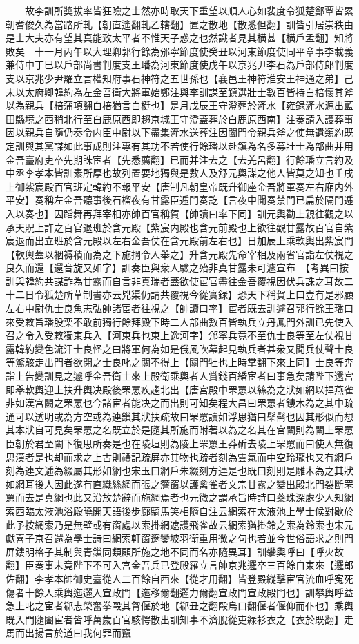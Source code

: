 　　故李訓所奬拔率皆狂險之士然亦時取天下重望以順人心如裴度令狐楚鄭覃皆累朝耆俊久為當路所軋【朝直遙翻軋乙轄翻】置之散地【散悉但翻】訓皆引居崇秩由是士大夫亦有望其真能致太平者不惟天子惑之也然識者見其横甚【横戶孟翻】知將敗矣　十一月丙午以大理卿郭行餘為邠寜節度使癸丑以河東節度使同平章事李載義兼侍中丁巳以戶部尚書判度支王璠為河東節度使戊午以京兆尹李石為戶部侍郎判度支以京兆少尹羅立言權知府事石神符之五世孫也【襄邑王神符淮安王神通之弟】己未以太府卿韓約為左金吾衛大將軍始鄭注與李訓謀至鎮選壯士數百皆持白棓懷其斧以為親兵【棓蒲項翻白棓猶言白梃也】是月戊辰王守澄葬於滻水【雍録滻水源出藍田縣境之西稍北行至白鹿原西即趨京城王守澄蓋葬於白鹿原西南】注奏請入護葬事因以親兵自隨仍奏令内臣中尉以下盡集滻水送葬注因闔門令親兵斧之使無遺類約既定訓與其黨謀如此事成則注專有其功不若使行餘璠以赴鎮為名多募壯士為部曲并用金吾臺府吏卒先期誅宦者【先悉薦翻】已而并注去之【去羌呂翻】行餘璠立言約及中丞李孝本皆訓素所厚也故列置要地獨與是數人及舒元輿謀之他人皆莫之知也壬戌上御紫宸殿百官班定韓約不報平安【唐制凡朝皇帝既升御座金吾將軍奏左右廂内外平安】奏稱左金吾聽事後石榴夜有甘露臣逓門奏訖【言夜中聞奏禁門已扁於隔門逓入以奏也】因蹈舞再拜宰相亦帥百官稱賀【帥讀曰率下同】訓元輿勸上親往觀之以承天貺上許之百官退班於含元殿【紫宸内殿也含元前殿也上欲往觀甘露故百官自紫宸退而出立班於含元殿以左右金吾仗在含元殿前左右也】日加辰上乘軟輿出紫宸門【軟輿蓋以裀褥積而為之下施掆令人舉之】升含元殿先命宰相及兩省官詣左仗視之良久而還【還音旋又如字】訓奏臣與衆人驗之殆非真甘露未可遽宣布　【考異曰按訓與韓約共謀詐為甘露而自言非真瑞者蓋欲使宦官盡往金吾覆視因伏兵誅之耳故二十二日令狐楚所草制書亦云兇渠仍請共覆視今從實録】恐天下稱賀上曰豈有是邪顧左右中尉仇士良魚志弘帥諸宦者往視之【帥讀曰率】宦者既去訓遽召郭行餘王璠曰來受敕旨璠股栗不敢前獨行餘拜殿下時二人部曲數百皆執兵立丹鳳門外訓已先使入召之令入受敕獨東兵入【河東兵也東上逸河字】邠寜兵竟不至仇士良等至左仗視甘露韓約變色流汗士良怪之曰將軍何為如是俄風吹幕起見執兵者甚衆又聞兵仗聲士良等驚駭走出門者欲閉之士良叱之關不得上【關門牡也上時掌翻下來上同】士良等奔詣上告變訓見之遽呼金吾衛士來上殿衛乘輿者人賞錢百緍宦者曰事急矣請陛下還宫即舉軟輿迎上扶升輿决殿後罘罳疾趨北出【唐宫殿中罘罳以絲為之狀如網以捍燕雀非如漢宫闕之罘罳也今諸宦者能决之而出則可知矣程大昌曰罘罳者鏤木為之其中疏通可以透明或為方空或為連鎻其狀扶疏故曰罘罳讀如浮思猶曰䯱髵也因其形似而想其本狀自可見矣罘罳之名既立於是隨其所施而附著以為之名其在宮闕則為闕上罘罳臣朝於君至闕下復思所奏是也在陵垣則為陵上罘罳王莽斫去陵上罘罳而曰使人無復思漢者是也却而求之上古則禮記疏屏亦其物也疏者刻為雲氣而中空玲瓏也又有網戶刻為連文逓為綴屬其形如網也宋玉曰網戶朱綴刻方連是也既曰刻則是雕木為之其狀如網耳後人因此遂有直織絲網而張之簷窗以護禽雀者文宗甘露之變出殿北門裂斷罘罳而去是真網也此又沿放楚辭而施網焉者也元微之謂承旨時詩曰蘂珠深處少人知網索西臨太液池浴殿曉開天語後步廊騎馬笑相隨自注云網索在太液池上學士候對歇於此予按網索乃是無壁或有窗處以索掛網遮護飛雀故云網索猶掛鈴之索為鈴索也宋元獻喜子京召還為學士詩曰網索軒窗邃鑾坡羽衛重用微之句也若並今世俗語求之則門屏鏤明格子其制與青鎻同類顧所施之地不同而名亦隨異耳】訓攀輿呼曰【呼火故翻】臣奏事未竟陛下不可入宫金吾兵已登殿羅立言帥京兆邏卒三百餘自東來【邏郎佐翻】李孝本帥御史臺從人二百餘自西來【從才用翻】皆登殿縱擊宦官流血呼寃死傷者十餘人乘輿迤邐入宣政門【迤移爾翻邐力爾翻宣政門宣政殿門也】訓攀輿呼益急上叱之宦者郗志榮奮拳毆其胷偃於地【郗丑之翻毆烏口翻偃者偃仰而仆也】乘輿既入門隨闔宦者皆呼萬歲百官駭愕散出訓知事不濟脫從吏緑衫衣之【衣於既翻】走馬而出揚言於道曰我何罪而竄